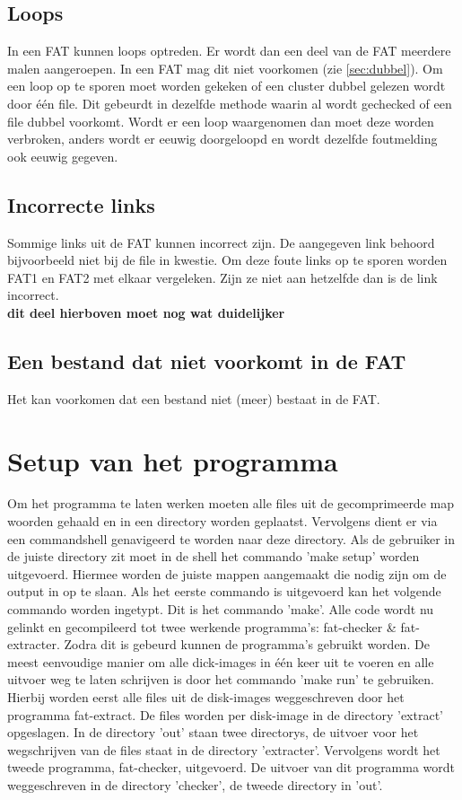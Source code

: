 \documentclass[11pt]{article}
\begin{document}
	\subsection{Loops}\label{sec:loops}
	In een FAT kunnen loops optreden. Er wordt dan een deel van de FAT meerdere malen aangeroepen. In een FAT mag dit niet voorkomen (zie \ref{sec:dubbel}). Om een loop op te sporen moet worden gekeken of een cluster dubbel gelezen wordt door \'e\'en file. Dit gebeurdt in dezelfde methode waarin al wordt gechecked of een file dubbel voorkomt. Wordt er een loop waargenomen dan moet deze worden verbroken, anders wordt er eeuwig doorgeloopd en wordt dezelfde foutmelding ook eeuwig gegeven.

	\subsection{Incorrecte links}\label{sec:links}
	Sommige links uit de FAT kunnen incorrect zijn. De aangegeven link behoord bijvoorbeeld niet bij de file in kwestie. Om deze foute links op te sporen worden FAT1 en FAT2 met elkaar vergeleken. Zijn ze niet aan hetzelfde dan is de link incorrect.\\
\LARGE \textbf{dit deel hierboven moet nog wat duidelijker }
\normalsize
	\subsection{Een bestand dat niet voorkomt in de FAT}\label{sec:dir}
	Het kan voorkomen dat een bestand niet (meer) bestaat in de FAT. 

	\section{Setup van het programma}\label{sec:setup}
	Om het programma te laten werken moeten alle files uit de gecomprimeerde map woorden gehaald en in een directory worden geplaatst. Vervolgens dient er via een commandshell genavigeerd te worden naar deze directory. Als de gebruiker in de juiste directory zit moet in de shell het commando 'make setup' worden uitgevoerd. 
Hiermee worden de juiste mappen aangemaakt die nodig zijn om de output in op te slaan. Als het eerste commando is uitgevoerd kan het volgende commando worden ingetypt. Dit is het commando 'make'. Alle code wordt nu gelinkt en gecompileerd tot twee werkende programma's: fat-checker \& fat-extracter. Zodra dit is gebeurd kunnen de programma's gebruikt worden. De meest eenvoudige manier om alle dick-images in \'e\'en keer uit te voeren en alle uitvoer weg te laten schrijven is door het commando 'make run' te gebruiken. Hierbij worden eerst alle files uit de disk-images weggeschreven door het programma fat-extract. De files worden per disk-image in de directory 'extract' opgeslagen. In de directory 'out' staan twee directorys, de uitvoer voor het wegschrijven van de files staat in de directory 'extracter'.
Vervolgens wordt het tweede programma, fat-checker, uitgevoerd. De uitvoer van dit programma wordt weggeschreven in de directory 'checker', de tweede directory in 'out'.
	
\end{document}
